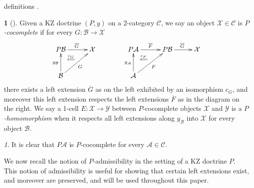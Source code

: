 \documentclass[a4paper,oneside,english]{amsart}
\numberwithin{equation}{section}
\numberwithin{figure}{section}
\theoremstyle{plain}
\theoremstyle{definition}
\newtheorem{defn}[thm]{\protect\definitionname}
\theoremstyle{remark}
\newtheorem{rem}[thm]{\protect\remarkname}
\theoremstyle{definition}
\theoremstyle{plain}
\theoremstyle{plain}
\theoremstyle{plain}
\providecommand{\definitionname}{Definition}
\providecommand{\remarkname}{Remark}
\begin{document}
definitions \cite[Theorems 5.1,5.2]{marm2012}.
\begin{defn}
[\cite{marm2012}] Given a KZ doctrine $\left(P,y\right)$ on a 2-category
$\mathscr{C}$, we say an object $\mathcal{X}\in\mathscr{C}$ is \emph{$P$-cocomplete}
if for every $G\colon\mathcal{B}\to\mathcal{X}$ 
\[
\xymatrix@=1em{P\mathcal{B}\ar@{->}[rr]^{\overline{G}}\ar@{}[rd]|-{\stackrel{c_{G}}{\Longleftarrow}} &  & \mathcal{X} &  &  & P\mathcal{A}\ar@{->}[rr]^{\overline{F}}\ar@{}[rd]|-{\stackrel{c_{F}}{\Longleftarrow}} &  & P\mathcal{B}\ar[rr]^{\overline{G}} &  & \mathcal{X}\\
 & \; &  &  &  &  & \;\\
\mathcal{B}\ar[rruu]_{G}\ar[uu]^{y_{\mathcal{B}}} &  &  &  &  & \mathcal{A}\ar[rruu]_{F}\ar[uu]^{y_{\mathcal{A}}}
}
\]
there exists a left extension $\overline{G}$ as on the left exhibited
by an isomorphism $c_{G}$, and moreover this left extension respects
the left extensions $\overline{F}$ as in the diagram on the right.
We say a 1-cell $E\colon\mathcal{X}\to\mathcal{Y}$ between $P$-cocomplete
objects $\mathcal{X}$ and $\mathcal{Y}$ is a \emph{$P$-homomorphism
}when it respects all left extensions along $y_{\mathcal{B}}$ into
$\mathcal{X}$ for every object $\mathcal{B}$. \end{defn}
\begin{rem}
It is clear that $P\mathcal{A}$ is $P$-cocomplete for every $\mathcal{A}\in\mathscr{C}$. 
\end{rem}
We now recall the notion of $P$-admissibility in the setting of a
KZ doctrine $P$. This notion of admissibility is useful for showing
that certain left extensions exist, and moreover are preserved, and
will be used throughout this paper.
\end{document}
